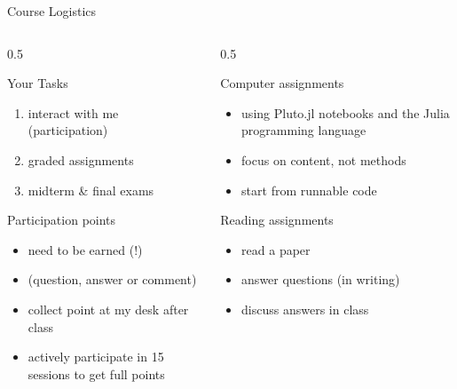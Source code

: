 \documentclass[aspectratio=169,mathserif]{beamer}
\begin{document}
\begin{frame}{Course Logistics}
  \begin{columns}[T]
  \begin{column}{0.5\linewidth}
   
    \begin{block}{Your Tasks}
      \begin{enumerate}
      \item interact with me (participation)
      \item graded assignments
      \item midterm \& final exams
      \end{enumerate}
    \end{block} 
    
    \begin{block}{Participation points}
      \begin{itemize}
      \item need to be earned (!)
      \item (question, answer or comment)
      \item collect point at my desk after class
      \item actively participate in 15 sessions to get full points
      \end{itemize}
    \end{block}
  \end{column}

  \begin{column}{0.5\linewidth}
    \begin{block}{Computer assignments}
      \begin{itemize}
      \item using Pluto.jl notebooks and the Julia programming language
      \item focus on content, not methods
      \item start from runnable code
      \end{itemize}
    \end{block}

     \begin{block}{Reading assignments}
      \begin{itemize}
      \item read a paper
      \item answer questions (in writing)
      \item discuss answers in class
      \end{itemize} 
     \end{block}
  \end{column}
\end{columns}
  
\end{frame}
\end{document}
